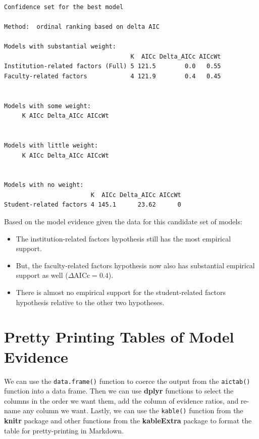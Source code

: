 \documentclass[]{book}
\providecommand{\tightlist}{%
  \setlength{\itemsep}{0pt}\setlength{\parskip}{0pt}}
\begin{document}
\begin{verbatim}

Confidence set for the best model

Method:  ordinal ranking based on delta AIC

Models with substantial weight:
                                   K  AICc Delta_AICc AICcWt
Institution-related factors (Full) 5 121.5        0.0   0.55
Faculty-related factors            4 121.9        0.4   0.45


Models with some weight:
     K AICc Delta_AICc AICcWt


Models with little weight:
     K AICc Delta_AICc AICcWt


Models with no weight:
                        K  AICc Delta_AICc AICcWt
Student-related factors 4 145.1      23.62      0
\end{verbatim}

Based on the model evidence given the data for this candidate set of models:

\begin{itemize}
\tightlist
\item
  The institution-related factors hypothesis still has the most empirical support.
\item
  But, the faculty-related factors hypothesis now also has substantial empirical support as well (\(\Delta\mathrm{AICc}=0.4\)).
\item
  There is almost no empirical support for the student-related factors hypothesis relative to the other two hypotheses.
\end{itemize}

\hypertarget{pretty-printing-tables-of-model-evidence}{%
\section{Pretty Printing Tables of Model Evidence}\label{pretty-printing-tables-of-model-evidence}}

We can use the \texttt{data.frame()} function to coerce the output from the \texttt{aictab()} function into a data frame. Then we can use \textbf{dplyr} functions to select the columns in the order we want them, add the column of evidence ratios, and re-name any column we want. Lastly, we can use the \texttt{kable()} function from the \textbf{knitr} package and other functions from the \textbf{kableExtra} package to format the table for pretty-printing in Markdown.
\end{document}

